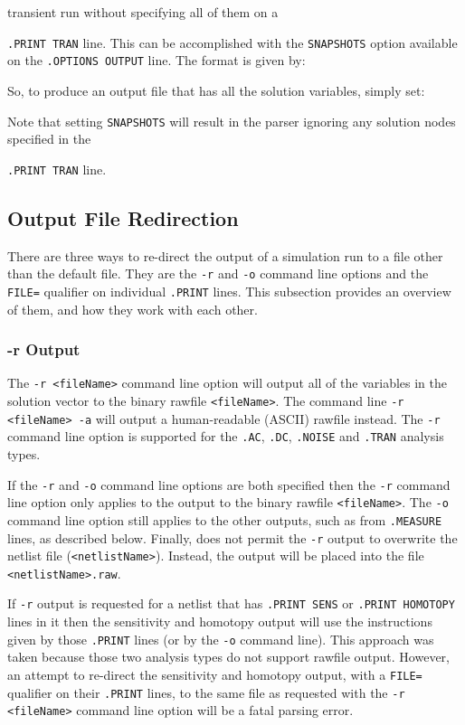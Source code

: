 transient run without specifying all of them on a {\texttt{.PRINT TRAN} line.  
This can be accomplished with the \texttt{SNAPSHOTS} option available on the
\texttt{.OPTIONS OUTPUT} line.  The format is given by:


\noindent So, to produce an output file that has all the solution variables, simply set:

Note that setting \texttt{SNAPSHOTS} will result in the parser ignoring any solution nodes
specified in the {\texttt{.PRINT TRAN} line.


\subsection{Output File Redirection}
There are three ways to re-direct the output of a \Xyce{} simulation run
to a file other than the default file.  They are the \verb+-r+ and 
\verb+-o+ command line options and the \texttt{FILE=} qualifier on  
individual \texttt{.PRINT} lines.  This subsection provides an overview of 
them, and how they work with each other. 

\subsubsection{-r Output}
The \verb+-r <fileName>+ command line option will output all of the variables 
in the solution vector to the binary rawfile \verb+<fileName>+.  The
command line \verb+-r  <fileName> -a+ will output a human-readable (ASCII) 
rawfile instead.  The \verb+-r+ command line option is supported for the
\texttt{.AC}, \texttt{.DC}, \texttt{.NOISE} and \texttt{.TRAN} analysis
types.  

If the \verb+-r+ and \verb+-o+ command line options are both specified then
the \verb+-r+ command line option only applies to the output to the binary
rawfile \verb+<fileName>+.  The \verb+-o+ command line option still applies
to the other outputs, such as from \texttt{.MEASURE} lines, as described below.
Finally, \Xyce{} does not permit the \verb+-r+ output to overwrite the netlist
file (\verb+<netlistName>+). Instead, the output will be placed into the
file \verb+<netlistName>.raw+.

If \verb+-r+ output is requested for a netlist that has \texttt{.PRINT SENS}
or \texttt{.PRINT HOMOTOPY} lines in it then the sensitivity and homotopy
output will use the instructions given by those \texttt{.PRINT} lines (or by the
\verb+-o+ command line).  This approach was taken because those two analysis types do not
support rawfile output.  However, an attempt to re-direct the sensitivity and homotopy output,
with a \texttt{FILE=} qualifier on their \texttt{.PRINT} lines, to the same file
as requested with the \verb+-r <fileName>+ command line option will be a
fatal parsing error.

}}
